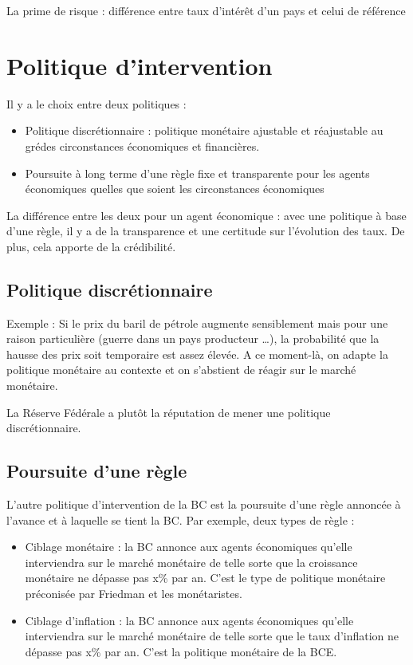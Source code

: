 La prime de risque : différence entre taux d'intérêt d'un pays et celui de référence


\section{Politique d'intervention}

Il y a le choix entre deux politiques :

\begin{itemize}
	\item Politique discrétionnaire : politique monétaire ajustable et réajustable au grédes circonstances économiques et financières.
	\item Poursuite à long terme d'une règle fixe et transparente pour les agents économiques quelles que soient les circonstances économiques
\end{itemize}

La différence entre les deux pour un agent économique : avec une politique à base d'une règle, il y a de la transparence et une certitude sur l'évolution des taux. De plus, cela apporte de la crédibilité.

	\subsection{Politique discrétionnaire}

	Exemple : Si le prix du baril de pétrole augmente sensiblement mais pour une raison particulière (guerre dans un pays producteur …), la probabilité que la hausse des prix soit temporaire est assez élevée. A ce moment-là, on adapte la politique monétaire au contexte et on s'abstient de réagir sur le marché monétaire.

	La Réserve Fédérale a plutôt la réputation de mener une politique discrétionnaire.

	\subsection{Poursuite d'une règle}
	
	L'autre politique d’intervention de la BC est la poursuite d'une règle annoncée 
à l'avance et à laquelle se tient la BC.
Par exemple, deux types de règle :
\begin{itemize}
	\item Ciblage monétaire : la BC annonce aux agents économiques qu'elle interviendra sur le marché monétaire de telle sorte que la croissance monétaire ne dépasse pas x\% par an. C'est le type de politique monétaire préconisée par Friedman et les monétaristes.
	\item  Ciblage d'inflation : la BC annonce aux agents économiques qu'elle interviendra sur le marché monétaire de telle sorte que le taux d’inflation ne dépasse pas x\% par an. C'est la politique monétaire de la BCE.
\end{itemize}


